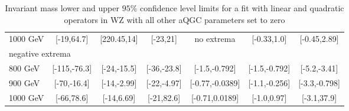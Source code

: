 \documentclass[../Bachelorarbeit.tex]{subfiles}
\begin{document}
\begin{table}[h]
\begin{tabular}{ l c c c c c c }
        1000 GeV & [-19,64.7]   & [220.45,14]   & [-23,21]     & no extrema      & [-0.33,1.0]   & [-0.45,2.89]  \\
        \multicolumn{7}{l}{ negative extrema }                                                                   \\
        800 GeV  & [-115,-76.3] & [-24,-15.5]   & [-36,-23.8]  & [-1.5,-0.792]   & [-1.5,-0.792] & [-5.2,-3.41]  \\
        900 GeV  & [-70,-16.4]  & [-14,-2.99]   & [-22,-4.97]  & [-0.77,-0.0389] & [-1.1,-0.256] & [-3.3,-0.798] \\
        1000 GeV & [-66,78.6]   & [-14,6.69]    & [-21,82.6]   & [-0.71,0.0189]  & [-1.0,0.97]   & [-3.1,37.9]   \\
        \hline
    \end{tabular}

    \caption{Invariant mass lower and upper $95\%$ confidence level limits for a fit with linear and quadratic operators in WZ with all other aQGC parameters set to zero}
    \label{tab:inv_mass_EFT_limits}

\end{table}
\end{document}
